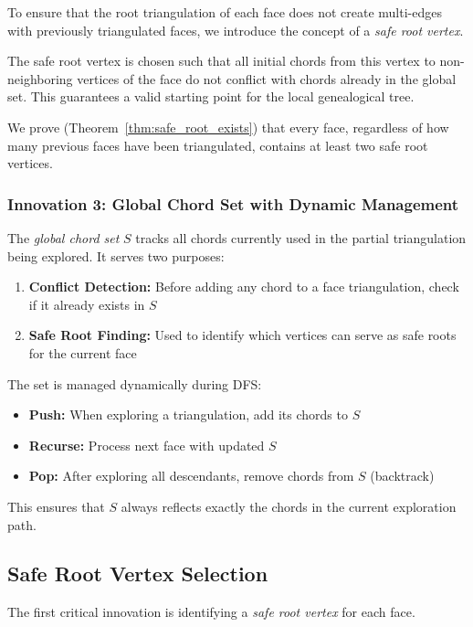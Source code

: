 \documentclass[12pt,a4paper]{article}
\theoremstyle{definition}
\theoremstyle{remark}
\begin{document}
To ensure that the root triangulation of each face does not create multi-edges with previously triangulated faces, we introduce the concept of a \emph{safe root vertex}.

The safe root vertex is chosen such that all initial chords from this vertex to non-neighboring vertices of the face do not conflict with chords already in the global set. This guarantees a valid starting point for the local genealogical tree.

We prove (Theorem~\ref{thm:safe_root_exists}) that every face, regardless of how many previous faces have been triangulated, contains at least two safe root vertices.

\subsubsection{Innovation 3: Global Chord Set with Dynamic Management}

The \emph{global chord set} $S$ tracks all chords currently used in the partial triangulation being explored. It serves two purposes:

\begin{enumerate}
    \item \textbf{Conflict Detection:} Before adding any chord to a face triangulation, check if it already exists in $S$
    \item \textbf{Safe Root Finding:} Used to identify which vertices can serve as safe roots for the current face
\end{enumerate}

The set is managed dynamically during DFS:
\begin{itemize}
    \item \textbf{Push:} When exploring a triangulation, add its chords to $S$
    \item \textbf{Recurse:} Process next face with updated $S$
    \item \textbf{Pop:} After exploring all descendants, remove chords from $S$ (backtrack)
\end{itemize}

This ensures that $S$ always reflects exactly the chords in the current exploration path.

\subsection{Safe Root Vertex Selection}

The first critical innovation is identifying a \emph{safe root vertex} for each face.
\end{document}
